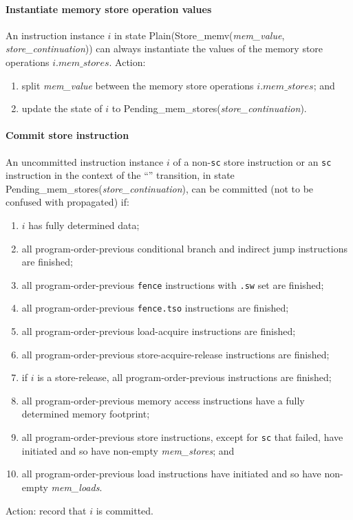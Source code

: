 \paragraph{Instantiate memory store operation values}\label{omm:instantiate_store_value}
An instruction instance $i$ in state {\sc Plain}({\sc Store\_memv}({\it mem\_value}, {\it store\_continuation})) can always instantiate the values of the memory store operations $i.\textit{mem\_stores}$.
Action:
\begin{enumerate}
\item split {\it mem\_value} between the memory store operations $i.\textit{mem\_stores}$; and
\item update the state of $i$ to {\sc Pending\_mem\_stores}({\it store\_continuation}).
\end{enumerate}


\paragraph{Commit store instruction}\label{omm:commit_stores}
An uncommitted instruction instance $i$ of a non-{\tt sc} store instruction or an {\tt sc} instruction in the context of the ``'' transition, in state {\sc Pending\_mem\_stores}({\it store\_continuation}), can be committed (not to be confused with propagated) if:
\begin{enumerate}
\item $i$ has fully determined data;
\item all program-order-previous conditional branch and indirect jump instructions are finished;
\item all program-order-previous {\tt fence} instructions with {\tt .sw} set are finished;
\item all program-order-previous {\tt fence.tso} instructions are finished;
\item all program-order-previous load-acquire instructions are finished;
\item all program-order-previous store-acquire-release instructions are finished;
\item  if $i$ is a store-release, all program-order-previous instructions are finished;
\item\label{omm:commit_store:prev_addrs} all program-order-previous memory access instructions have a fully determined memory footprint;
\item\label{omm:commit_store:prev_stores} all program-order-previous store instructions, except for {\tt sc} that failed, have initiated and so have non-empty {\it mem\_stores}; and
\item\label{omm:commit_store:prev_loads} all program-order-previous load instructions have initiated and so have non-empty {\it mem\_loads}.
\end{enumerate}
Action: record that $i$ is committed.

